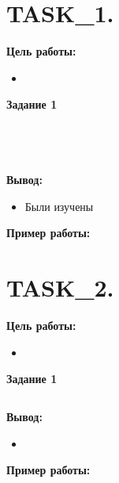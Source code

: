 \chapter{TASK\_1.}

\textbf{Цель работы:}

\begin{itemize} 
	\item 
\end{itemize}

\textbf{Задание 1}


\begin{lstlisting}[caption=Код программы. TASK\_1. Главнвая функция main]
	
\end{lstlisting}

\begin{lstlisting}[caption=Код программы. TASK\_1. Реализация заданий]
	
\end{lstlisting}


\textbf{Вывод:}

\begin{itemize} 
	\item Были изучены
\end{itemize}

\textbf{Пример работы:}



\chapter{TASK\_2.}

\textbf{Цель работы:}

\begin{itemize} 
	\item 
\end{itemize}

\textbf{Задание 1}

\begin{lstlisting}[caption=Код программы. TASK\_2. Реализация заданий]

\end{lstlisting}


\textbf{Вывод:}

\begin{itemize} 
	\item 
\end{itemize}


\textbf{Пример работы:}

